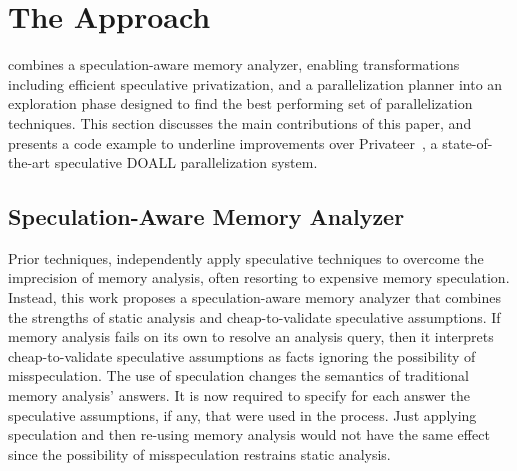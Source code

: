 \section{The \name Approach}

\name combines a speculation-aware memory analyzer, enabling
transformations including efficient speculative privatization, and a
parallelization planner into an exploration phase designed to find the
best performing set of parallelization techniques.  This section
discusses the main contributions of this paper, and presents a code
example to underline improvements over
Privateer~\cite{johnson:12:pldi}, a state-of-the-art speculative DOALL
parallelization system.

\subsection{Speculation-Aware Memory Analyzer}


%
Prior techniques, independently apply speculative techniques to
overcome the imprecision of memory analysis, often resorting to
expensive memory speculation.
%
%
%
%
Instead, this work proposes a speculation-aware memory analyzer that
combines the strengths of static analysis and cheap-to-validate
speculative assumptions.  If memory analysis fails on its own to
resolve an analysis query, then it interprets cheap-to-validate
speculative assumptions as facts ignoring the possibility of
misspeculation.
%
The use of speculation changes the semantics of traditional memory
analysis' answers. It is now required to specify for each answer the
speculative assumptions, if any, that were used in the process.
%
Just applying speculation and then re-using memory analysis would not
have the same effect since the possibility of misspeculation restrains
static analysis.

%
%

